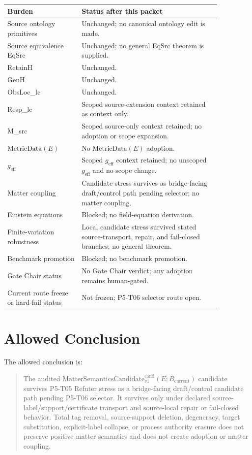 \documentclass[11pt]{article}
\newcommand{\MetricData}{\mathrm{MetricData}}
\newcommand{\geff}{g_{\mathrm{eff}}}
\newcommand{\Bcur}{B_{\mathrm{current}}}
\newcommand{\MSCand}{\mathrm{MatterSemanticsCandidate}^{\mathrm{cand}}_{v1}}
\begin{document}
\begin{longtable}{p{0.30\linewidth}p{0.56\linewidth}}
\toprule
Burden & Status after this packet \\
\midrule
Source ontology primitives & Unchanged; no canonical ontology edit is made. \\
Source equivalence EqSrc & Unchanged; no general EqSrc theorem is supplied. \\
RetainH & Unchanged. \\
GenH & Unchanged. \\
ObsLoc\_lc & Unchanged. \\
Resp\_lc & Scoped source-extension context retained as context only. \\
M\_src & Scoped source-only context retained; no adoption or scope expansion. \\
\(\MetricData(E)\) & No \(\MetricData(E)\) adoption. \\
\(\geff\) & Scoped \(\geff\) context retained; no unscoped \(\geff\) and no scope change. \\
Matter coupling & Candidate stress survives as bridge-facing draft/control path pending selector; no matter coupling. \\
Einstein equations & Blocked; no field-equation derivation. \\
Finite-variation robustness & Local candidate stress survived stated source-transport, repair, and fail-closed branches; no general theorem. \\
Benchmark promotion & Blocked; no benchmark promotion. \\
Gate Chair status & No Gate Chair verdict; any adoption remains human-gated. \\
Current route freeze or hard-fail status & Not frozen; P5-T06 selector route open. \\
\bottomrule
\end{longtable}

\section{Allowed Conclusion}

The allowed conclusion is:
\begin{quote}
The audited \(\MSCand(E;\Bcur)\) candidate survives P5-T05 Refuter stress as a
bridge-facing draft/control candidate path pending P5-T06 selector. It
survives only under declared source-label/support/certificate transport and
source-local repair or fail-closed behavior. Total tag removal, source-support
deletion, degeneracy, target substitution, explicit-label collapse, or process
authority erasure does not preserve positive matter semantics and does not
create adoption or matter coupling.
\end{quote}
\end{document}
